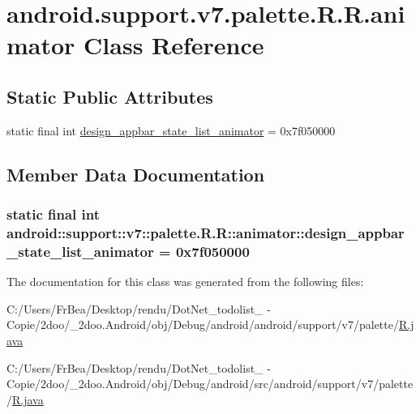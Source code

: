 \hypertarget{classandroid_1_1support_1_1v7_1_1palette_1_1_r_1_1animator}{
\section{android.support.v7.palette.R.R.animator Class Reference}
\label{classandroid_1_1support_1_1v7_1_1palette_1_1_r_1_1animator}
}
\subsection*{Static Public Attributes}
\begin{CompactItemize}
\item 
static final int \hyperlink{classandroid_1_1support_1_1v7_1_1palette_1_1_r_1_1animator_3a75144d3b181f5ff50d288d7587d823}{design\_\-appbar\_\-state\_\-list\_\-animator} = 0x7f050000
\end{CompactItemize}


\subsection{Member Data Documentation}
\hypertarget{classandroid_1_1support_1_1v7_1_1palette_1_1_r_1_1animator_3a75144d3b181f5ff50d288d7587d823}{
\subsubsection[{design\_\-appbar\_\-state\_\-list\_\-animator}]{\setlength{\rightskip}{0pt plus 5cm}static final int android::support::v7::palette.R.R::animator::design\_\-appbar\_\-state\_\-list\_\-animator = 0x7f050000}}
\label{classandroid_1_1support_1_1v7_1_1palette_1_1_r_1_1animator_3a75144d3b181f5ff50d288d7587d823}




The documentation for this class was generated from the following files:\begin{CompactItemize}
\item 
C:/Users/FrBea/Desktop/rendu/DotNet\_\-todolist\_ - Copie/2doo/\_\-2doo.Android/obj/Debug/android/android/support/v7/palette/\hyperlink{android_2support_2v7_2palette_2_r_8java}{R.java}\item 
C:/Users/FrBea/Desktop/rendu/DotNet\_\-todolist\_ - Copie/2doo/\_\-2doo.Android/obj/Debug/android/src/android/support/v7/palette/\hyperlink{src_2android_2support_2v7_2palette_2_r_8java}{R.java}\end{CompactItemize}
